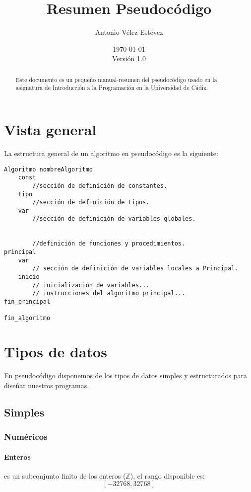 \documentclass{article}
\title{Resumen Pseudocódigo}
\author{Antonio Vélez Estévez}
\date{\today\\\vspace{2em}Versión 1.0}
\begin{document}
\maketitle
\begin{abstract}
  
  Este documento es un pequeño manual-resumen del pseudocódigo usado en la asignatura de Introducción a la Programación en la Universidad de Cádiz.
  
\end{abstract}

\tableofcontents

\pagebreak

\section{Vista general}

La estructura general de un algoritmo en pseudocódigo es la siguiente:

\begin{lstlisting}[language=pseudocodigoesp]
Algoritmo nombreAlgoritmo
    const
        //sección de definición de constantes.
    tipo
        //sección de definición de tipos.
    var
        //sección de definición de variables globales.


        //definición de funciones y procedimientos.
principal
    var
        // sección de definición de variables locales a Principal.
    inicio
        // inicialización de variables...
        // instrucciones del algoritmo principal...
fin_principal

fin_algoritmo
\end{lstlisting}

\section{Tipos de datos}

En pseudocódigo disponemos de los tipos de datos simples y estructurados para diseñar nuestros programas.

\subsection{Simples}

\subsubsection{Numéricos}

\paragraph{Enteros}
es un subconjunto finito de los enteros ($\mathbb{Z}$), el rango disponible es: $$\left[-32768, 32768\right]$$
\end{document}
